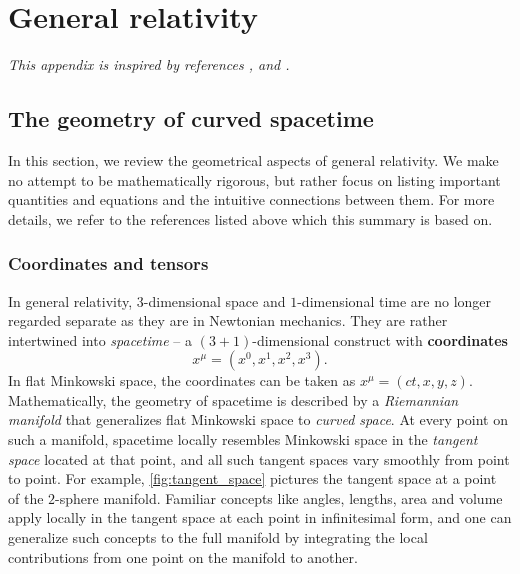 \appendix

\chapter{General relativity}
\label{chap:gr}

\textit{This appendix is inspired by references \cite{ref:carroll}, \cite{ref:mtw} and \cite{ref:mika_gr_notes}.}

\section{The geometry of curved spacetime}
\label{chap:gr_summary} %

\newcommand\pdvx[2]{\pdv{x^{#1}}{x^{#2}}}

In this section, we review the geometrical aspects of general relativity.
We make no attempt to be mathematically rigorous, but rather focus on listing important quantities and equations and the intuitive connections between them.
For more details, we refer to the references listed above which this summary is based on.

\subsection{Coordinates and tensors}

In general relativity, $3$-dimensional space and $1$-dimensional time are no longer regarded separate as they are in Newtonian mechanics.
They are rather intertwined into \emph{spacetime} -- a $(3+1)$-dimensional construct with \textbf{coordinates}
\begin{equation}
	x^\mu = (x^0, x^1, x^2, x^3) .
\end{equation}
In flat Minkowski space, the coordinates can be taken as $x^\mu = (ct, x, y, z)$.
Mathematically, the geometry of spacetime is described by a \emph{Riemannian manifold} that generalizes flat Minkowski space to \emph{curved space}.
At every point on such a manifold, spacetime locally resembles Minkowski space in the \emph{tangent space} located at that point, and all such tangent spaces vary smoothly from point to point.
For example, \cref{fig:tangent_space} pictures the tangent space at a point of the $2$-sphere manifold.
Familiar concepts like angles, lengths, area and volume apply locally in the tangent space at each point in infinitesimal form, and one can generalize such concepts to the full manifold by integrating the local contributions from one point on the manifold to another.

